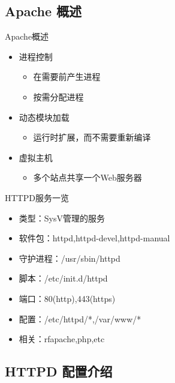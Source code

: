 \subsection{Apache 概述}

\begin{frame}{Apache概述}
\begin{itemize}
\item 进程控制

\begin{itemize}
\item 在需要前产生进程
\item 按需分配进程
\end{itemize}
\item 动态模块加载

\begin{itemize}
\item 运行时扩展，而不需要重新编译
\end{itemize}
\item 虚拟主机

\begin{itemize}
\item 多个站点共享一个Web服务器
\end{itemize}
\end{itemize}

\end{frame} 
\begin{frame}{HTTPD服务一览}
\begin{itemize}
\item 类型：SysV管理的服务
\item 软件包：httpd,httpd-devel,httpd-manual
\item 守护进程：/usr/sbin/httpd
\item 脚本：/etc/init.d/httpd
\item 端口：80(http),443(https)
\item 配置：/etc/httpd/{*},/var/www/{*}
\item 相关：rfapache,php,etc
\end{itemize}

\end{frame} 
\subsection{HTTPD 配置介绍}


